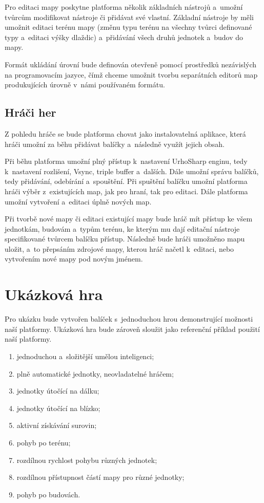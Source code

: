 Pro editaci mapy poskytne platforma několik základních nástrojů a~umožní tvůrcům modifikovat nástroje či přidávat své vlastní. Základní nástroje by měli umožnit editaci terénu mapy (změnu typu terénu na všechny tvůrci definované typy a~editaci výšky dlaždic) a~přidávání všech druhů jednotek a~budov do mapy.

Formát ukládání úrovní bude definován otevřeně pomocí prostředků nezávislých na programovacím jazyce, čímž chceme umožnit tvorbu separátních editorů map produkujících úrovně v~námi používaném formátu.

\subsection{Hráči her}
Z pohledu hráče se bude platforma chovat jako instalovatelná aplikace, která hráči umožní za běhu přidávat balíčky a~následně využít jejich obsah.

Při běhu platforma umožní plný přístup k~nastavení UrhoSharp enginu, tedy k~nastavení rozlišení, Vsync, triple buffer a~dalších. Dále umožní správu balíčků, tedy přidávání, odebírání a~spouštění. Při spuštění balíčku umožní platforma hráči výběr z~existujících map, jak pro hraní, tak pro editaci. Dále platforma umožní vytvoření a~editaci úplně nových map.

Při tvorbě nové mapy či editaci existující mapy bude hráč mít přístup ke všem jednotkám, budovám a~typům terénu, ke kterým mu dají editační nástroje specifikované tvůrcem balíčku přístup. Následně bude hráči umožněno mapu uložit, a~to přepsáním zdrojové mapy, kterou hráč načetl k~editaci, nebo vytvořením nové mapy pod novým jménem.

\section{Ukázková hra}
\label{sec:showcasedef}

Pro ukázku bude vytvořen balíček s~jednoduchou hrou demonstrující možnosti naší platformy. Ukázková hra bude zároveň sloužit jako referenční příklad použití naší platformy.

\begin{enumerate}
	\item jednoduchou a~složitější umělou inteligenci;
	\item plně automatické jednotky, neovladatelné hráčem;
	\item jednotky útočící na dálku;
	\item jednotky útočící na blízko;
	\item aktivní získávání surovin;
	\item pohyb po terénu;
	\item rozdílnou rychlost pohybu různých jednotek;
	\item rozdílnou přístupnost částí mapy pro různé jednotky;
	\item pohyb po budovách.
\end{enumerate}

